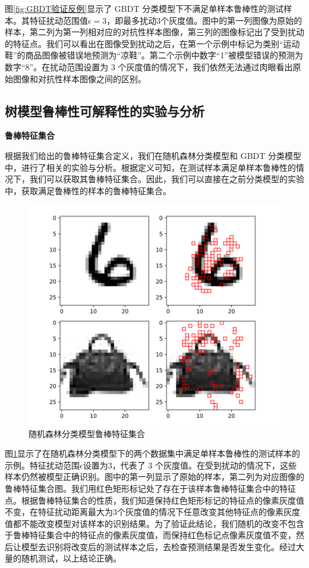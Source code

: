 图\ref{fig:GBDT验证反例}显示了 GBDT 分类模型下不满足单样本鲁棒性的测试样本。其特征扰动范围值$\epsilon=3$，即最多扰动3个灰度值。图中的第一列图像为原始的样本，第二列为第一列相对应的对抗性样本图像，第三列的图像标记出了受到扰动的特征点。我们可以看出在图像受到扰动之后，在第一个示例中标记为类别“运动鞋”的商品图像被错误地预测为“凉鞋”。第二个示例中数字“1”被模型错误的预测为数字“8”。在扰动范围设置为 3 个灰度值的情况下，我们依然无法通过肉眼看出原始图像和对抗性样本图像之间的区别。

\subsection{树模型鲁棒性可解释性的实验与分析}
\textbf{鲁棒特征集合}

根据我们给出的鲁棒特征集合定义，我们在随机森林分类模型和 GBDT 分类模型中，进行了相关的实验与分析。根据定义可知，在测试样本满足单样本鲁棒性的情况下，我们可以获取其鲁棒特征集合。因此，我们可以直接在之前分类模型的实验中，获取满足鲁棒性的样本的鲁棒特征集合。

\begin{figure}[!hbt]
\centering
	\includegraphics[scale=0.5]{fig2/C5/robust_feature_set.png}
	\caption{随机森林分类模型鲁棒特征集合}
	\label{fig:robust_feature_set}	
\end{figure}

图\ref{fig:robust_feature_set}显示了在随机森林分类模型下的两个数据集中满足单样本鲁棒性的测试样本的示例。特征扰动范围$\epsilon$设置为3，代表了 3 个灰度值。在受到扰动的情况下，这些样本仍然被模型正确识别。图中的第一列显示了原始的样本，第二列为对应图像的鲁棒特征集合图。我们用红色矩形标记处了存在于该样本鲁棒特征集合中的特征点。根据鲁棒特征集合的性质，我们知道保持红色矩形标记的特征点的像素灰度值不变，在特征扰动距离最大为3个灰度值的情况下任意改变其他特征点的像素灰度值都不能改变模型对该样本的识别结果。为了验证此结论，我们随机的改变不包含于鲁棒特征集合中的特征点的像素灰度值，而保持红色标记点像素灰度值不变，然后让模型去识别将改变后的测试样本之后，去检查预测结果是否发生变化。经过大量的随机测试，以上结论正确。

